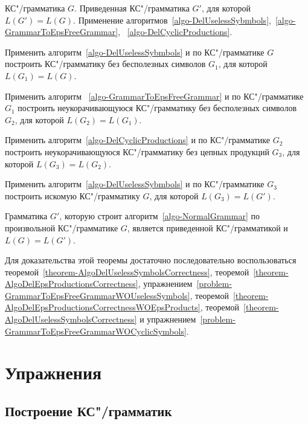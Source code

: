 {\label{algo-NormalGrammar}КС"/грамматика $G$.}
{Приведенная КС"/грамматика $G'$, для которой $L(G')=L(G)$.}
{Применение алгоритмов~\ref{algo-DelUselessSybmbols},~\ref{algo-GrammarToEpsFreeGrammar}, ~\ref{algo-DelCyclicProductions}.}
{
\item Применить алгоритм~\ref{algo-DelUselessSybmbols} и по КС"/грамматике $G$ построить КС"/грамматику без бесполезных символов $G_1$, для которой $L(G_1)=L(G)$.

\item Применить алгоритм ~\ref{algo-GrammarToEpsFreeGrammar} и по КС"/грамматике $G_1$ построить неукорачивающуюся КС"/грамматику без бесполезных символов $G_2$, для которой $L(G_2)=L(G_1)$.

\item Применить алгоритм~\ref{algo-DelCyclicProductions} и по КС"/грамматике $G_2$ построить неукорачивающуюся КС"/грамматику без цепных продукций $G_3$, для которой $L(G_3)=L(G_2)$.

\item Применить алгоритм~\ref{algo-DelUselessSybmbols} и по КС"/грамматике $G_3$ построить искомую КС"/грамматику $G$, для которой $L(G_3)=L(G')$.
}

\begin{mytheorem}
\label{theorem-NormalGrammarAlgoCorrectness}
Грамматика $G'$, которую строит алгоритм~\ref{algo-NormalGrammar} по произвольной КС"/грамматике $G$, является приведенной КС"/грамматикой и $L(G)=L(G')$.
\end{mytheorem}

\begin{myproof}
Для доказательства этой теоремы достаточно последовательно воспользоваться теоремой~\ref{theorem-AlgoDelUselessSymbolsCorrectness}, теоремой~\ref{theorem-AlgoDelEpsProductionsCorrectness}, упражнением~\ref{problem-GrammarToEpsFreeGrammarWOUselessSymbols}, теоремой~\ref{theorem-AlgoDelEpsProductionsCorrectnessWOEpsProducts}, теоремой~\ref{theorem-AlgoDelUselessSymbolsCorrectness} и упражнением~\ref{problem-GrammarToEpsFreeGrammarWOCyclicSymbols}.
\end{myproof}

\section{Упражнения}
\label{Chapter6Exs}
\subsection*{Построение КС"/грамматик}

